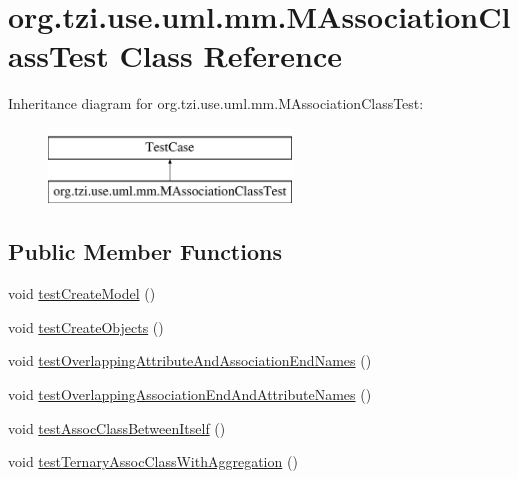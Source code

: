 \hypertarget{classorg_1_1tzi_1_1use_1_1uml_1_1mm_1_1_m_association_class_test}{\section{org.\-tzi.\-use.\-uml.\-mm.\-M\-Association\-Class\-Test Class Reference}
\label{classorg_1_1tzi_1_1use_1_1uml_1_1mm_1_1_m_association_class_test}
}
Inheritance diagram for org.\-tzi.\-use.\-uml.\-mm.\-M\-Association\-Class\-Test\-:\begin{figure}[H]
\begin{center}
\leavevmode
\includegraphics[height=2.000000cm]{classorg_1_1tzi_1_1use_1_1uml_1_1mm_1_1_m_association_class_test}
\end{center}
\end{figure}
\subsection*{Public Member Functions}
\begin{DoxyCompactItemize}
\item 
void \hyperlink{classorg_1_1tzi_1_1use_1_1uml_1_1mm_1_1_m_association_class_test_a41f17fc472f1245c7c5315c7d7c8ceaf}{test\-Create\-Model} ()
\item 
void \hyperlink{classorg_1_1tzi_1_1use_1_1uml_1_1mm_1_1_m_association_class_test_a54f506fd1b0c20db58b6aafb57ca50f5}{test\-Create\-Objects} ()
\item 
void \hyperlink{classorg_1_1tzi_1_1use_1_1uml_1_1mm_1_1_m_association_class_test_aa530363f205621979ace56ccc39f925f}{test\-Overlapping\-Attribute\-And\-Association\-End\-Names} ()
\item 
void \hyperlink{classorg_1_1tzi_1_1use_1_1uml_1_1mm_1_1_m_association_class_test_aff403ed724b58ca77e484075cdec3068}{test\-Overlapping\-Association\-End\-And\-Attribute\-Names} ()
\item 
void \hyperlink{classorg_1_1tzi_1_1use_1_1uml_1_1mm_1_1_m_association_class_test_a86e2c6048f4548237154d365be681959}{test\-Assoc\-Class\-Between\-Itself} ()
\item 
void \hyperlink{classorg_1_1tzi_1_1use_1_1uml_1_1mm_1_1_m_association_class_test_af119341fd60a285f0c053b36ffa301ee}{test\-Ternary\-Assoc\-Class\-With\-Aggregation} ()
\end{DoxyCompactItemize}
